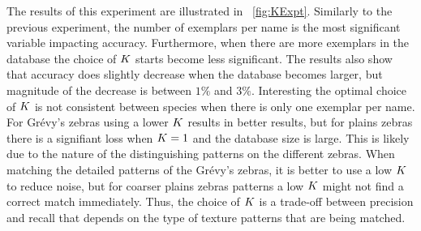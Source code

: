         The results of this experiment are illustrated in ~\cref{fig:KExpt}.
        Similarly to the previous experiment, the number of exemplars per name is the most significant variable
          impacting accuracy.
        Furthermore, when there are more exemplars in the database the choice of $K$ starts become less
          significant.
        The results also show that accuracy does slightly decrease when the database becomes larger, but
          magnitude of the decrease is between $1\percent$ and $3\percent$.
        Interesting the optimal choice of $K$ is not consistent between species when there is only one exemplar
          per name.
        For Grévy's zebras using a lower $K$ results in better results, but for plains zebras there is a
          signifiant loss when $K=1$ and the database size is large.
        This is likely due to the nature of the distinguishing patterns on the different zebras.
        When matching the detailed patterns of the Grévy's zebras, it is better to use a low $K$ to reduce
          noise, but for coarser plains zebras patterns a low $K$ might not find a correct match immediately.
        Thus, the choice of $K$ is a trade-off between precision and recall that depends on the type of texture
          patterns that are being matched.
        

